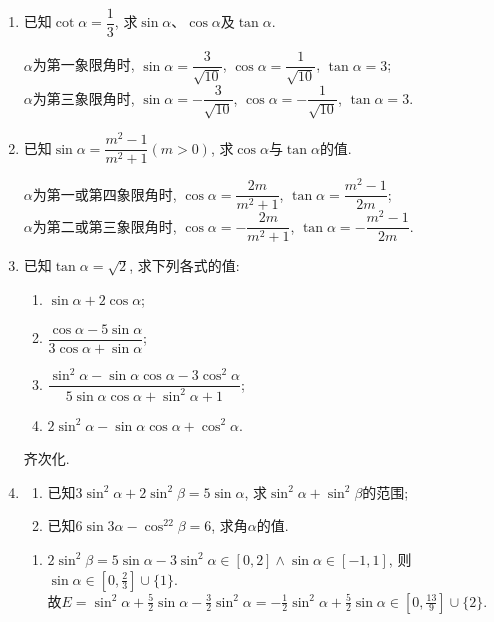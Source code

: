 \begin{enumerate}
\item 已知$\cot\alpha=\dfrac{1}{3}$, 求$\sin\alpha$、$\cos\alpha$及$\tan\alpha$. 
\begin{jieda}
$\alpha$为第一象限角时, $\sin\alpha=\dfrac{3}{\sqrt{10}}$, $\cos\alpha=\dfrac{1}{\sqrt{10}}$, $\tan\alpha=3$; \\
$\alpha$为第三象限角时, $\sin\alpha=-\dfrac{3}{\sqrt{10}}$, $\cos\alpha=-\dfrac{1}{\sqrt{10}}$, $\tan\alpha=3$. 
\end{jieda}

\item 已知$\sin\alpha=\dfrac{m^2-1}{m^2+1}(m>0)$, 求$\cos\alpha$与$\tan\alpha$的值. 
\begin{jieda}
$\alpha$为第一或第四象限角时, $\cos\alpha=\dfrac{2m}{m^2+1}$, $\tan\alpha=\dfrac{m^2-1}{2m}$; \\
$\alpha$为第二或第三象限角时, $\cos\alpha=-\dfrac{2m}{m^2+1}$, $\tan\alpha=-\dfrac{m^2-1}{2m}$. 
\end{jieda}



\item 已知$\tan\alpha=\sqrt{2}$, 求下列各式的值:
\begin{enumerate}[(1)]
\item $\sin\alpha+2\cos\alpha$; 
\item $\dfrac{\cos\alpha-5\sin\alpha}{3\cos\alpha+\sin\alpha}$; 
\item $\dfrac{\sin^2\alpha-\sin\alpha\cos\alpha-3\cos^2\alpha}{5\sin\alpha\cos\alpha+\sin^2\alpha+1}$; 
\item $2\sin^2\alpha-\sin\alpha\cos\alpha+\cos^2\alpha$. 
\end{enumerate}
\begin{jieda}
齐次化. \\
\end{jieda}



\item
\begin{enumerate}
\item 已知$3\sin^2\alpha+2\sin^2\beta=5\sin\alpha$, 求$\sin^2\alpha+\sin^2\beta$的范围; 
\item 已知$6\sin3\alpha-\cos^22\beta=6$, 求角$\alpha$的值. 
\end{enumerate}
\begin{jieda}
\begin{enumerate}
\item $2\sin^2\beta=5\sin\alpha-3\sin^2\alpha\in[0,2]\land\sin\alpha\in[-1,1]$, 则$\sin\alpha\in[0,\frac{2}{3}]\cup\{1\}$. \\
故$E=\sin^2\alpha+\frac{5}{2}\sin\alpha-\frac{3}{2}\sin^2\alpha=-\frac{1}{2}\sin^2\alpha+\frac{5}{2}\sin\alpha\in[0,\frac{13}{9}]\cup\{2\}$. 


\end{enumerate}
\end{jieda}
\end{enumerate}
